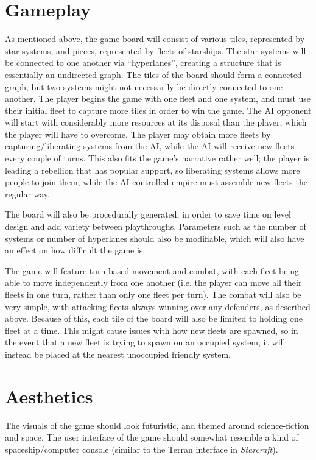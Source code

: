 \documentclass[10pt]{article}
\begin{document}
\section{Gameplay}

As mentioned above, the game board will consist of various tiles, represented by star systems, and pieces, represented by
fleets of starships. The star systems will be connected to one another via ``hyperlanes'', creating a structure that is essentially an undirected graph.
The tiles of the board should form a connected graph, but two systems might not necessarily be directly connected to one another.
The player begins the game with one fleet and one system, and must use their initial fleet to capture
more tiles in order to win the game. The AI opponent will start with considerably more resources at its disposal than the player,
which the player will have to overcome. The player may obtain more fleets by capturing/liberating systems from the AI,
while the AI will receive new fleets every couple of turns. This also fits the game's narrative rather well; the player is leading
a rebellion that has popular support, so liberating systems allows more people to join them, while the AI-controlled empire must
assemble new fleets the regular way.

The board will also be procedurally generated, in order to save time on level design and add variety between playthroughs.
Parameters such as the number of systems or number of hyperlanes should also be modifiable, which will also have an effect
on how difficult the game is.

The game will feature turn-based movement and combat, with each fleet being able to move independently from one another
(i.e. the player can move all their fleets in one turn, rather than only one fleet per turn). The combat will also be very simple,
with attacking fleets always winning over any defenders, as described above. Because of this, each tile of the board will also be limited
to holding one fleet at a time. This might cause issues with how new fleets are spawned, so in the event that a new fleet is trying to spawn
on an occupied system, it will instead be placed at the nearest unoccupied friendly system.

\section{Aesthetics}

The visuals of the game should look futuristic, and themed around science-fiction and space.
The user interface of the game should somewhat resemble a kind of spaceship/computer console
(similar to the Terran interface in \textit{Starcraft}).
\end{document}
